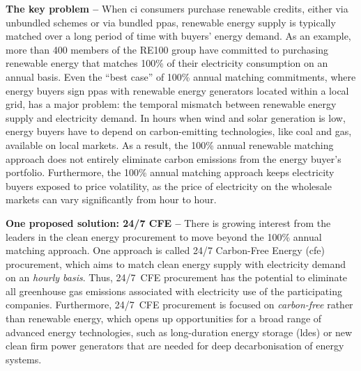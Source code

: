 \textbf{The key problem --} When \gls{ci} consumers purchase renewable credits, either via unbundled schemes or via bundled \gls{ppa}s, renewable energy supply is typically matched over a long period of time with buyers' energy demand.
As an example, more than 400 members of the RE100 group \cite{re100report-2020} have committed to purchasing renewable energy that matches 100\% of their electricity consumption on an annual basis.
Even the \enquote{best case} of 100\% annual matching commitments, where energy buyers sign \gls{ppa}s with renewable energy generators located within a local grid, has a major problem: the temporal mismatch between renewable energy supply and electricity demand.
In hours when wind and solar generation is low, energy buyers have to depend on carbon-emitting technologies, like coal and gas, available on local markets.
As a result, the 100\% annual renewable matching approach does not entirely eliminate carbon emissions from the energy buyer's portfolio.
Furthermore, the 100\% annual matching approach keeps electricity buyers exposed to price volatility, as the price of electricity on the wholesale markets can vary significantly from hour to hour.


\textbf{One proposed solution: 24/7 CFE --} There is growing interest from the leaders in the clean energy procurement to move beyond the 100\% annual matching approach.
One approach is called 24/7 Carbon-Free Energy (\gls{cfe}) procurement, which aims to match clean energy supply with electricity demand on an \textit{hourly basis}.
Thus, 24/7~CFE procurement has the potential to eliminate all greenhouse gas emissions associated with electricity use of the participating companies.
Furthermore, 24/7~CFE procurement is focused on \textit{carbon-free} rather than renewable energy, which opens up opportunities for a broad range of advanced energy technologies, such as long-duration energy storage (\gls{ldes}) or new clean firm power generators that are needed for deep decarbonisation of energy systems.

